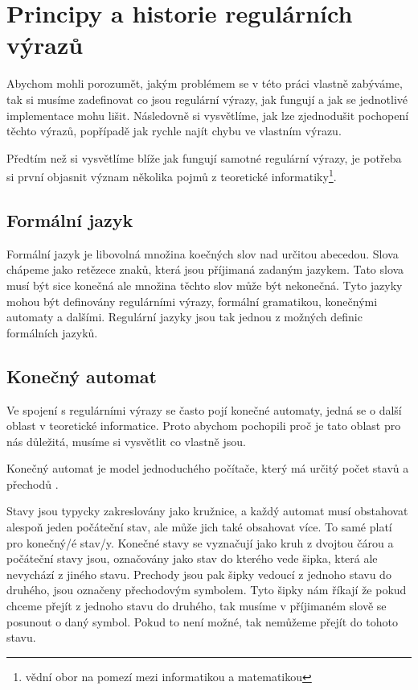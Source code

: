 \chapter{Principy a historie regulárních výrazů}\label{sec:Principle}

Abychom mohli porozumět, jakým problémem se v této práci vlastně zabýváme, tak si musíme zadefinovat co jsou
regulární výrazy, jak fungují a jak se jednotlivé implementace mohu lišit. Následovně si vysvětlíme, jak lze zjednodušit
pochopení těchto výrazů, popřípadě jak rychle najít chybu ve vlastním výrazu. 

Předtím než si vysvětlíme blíže jak fungují samotné regulární výrazy, je potřeba si první objasnit význam několika pojmů z teoretické informatiky\footnote{vědní obor na pomezí mezi informatikou a matematikou}.

\section{Formální jazyk}
Formální jazyk je libovolná množina koečných slov nad určitou abecedou. 
Slova chápeme jako retězece znaků, která jsou příjimaná zadaným jazykem.
Tato slova musí být sice konečná ale množina těchto slov může být nekonečná. 
Tyto jazyky mohou být definovány regulárními výrazy, formální gramatikou,
konečnými automaty a dalšími. Regulární jazyky jsou tak jednou z možných definic formálních jazyků.

\section{Konečný automat}
Ve spojení s regulárními výrazy se často pojí konečné automaty, jedná se o další oblast v teoretické informatice.
Proto abychom pochopili proč je tato oblast pro nás důležitá, musíme si vysvětlit co vlastně jsou.

Konečný automat je model jednoduchého počítače, který má určitý počet stavů a přechodů \cite{Havrlant}. 

Stavy jsou typycky zakreslovány jako kružnice, a každý automat musí obstahovat alespoň jeden počáteční stav,
ale může jich také obsahovat více. To samé platí pro konečný/é stav/y. Konečné stavy se vyznačují jako kruh z dvojtou čárou a počáteční stavy jsou, 
označovány jako stav do kterého vede šipka, která ale nevychází z jiného stavu.
Prechody jsou pak šipky vedoucí z jednoho stavu do druhého, jsou označeny přechodovým symbolem.
Tyto šipky nám říkají že pokud chceme přejít z jednoho stavu do druhého, tak musíme v příjimaném slově se posunout o
daný symbol. Pokud to není možné, tak nemůžeme přejít do tohoto stavu.


